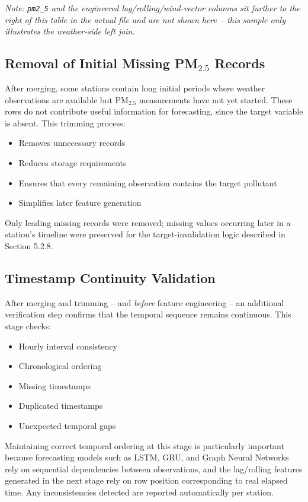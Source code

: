 \textit{Note: \texttt{pm2\_5} and the engineered lag/rolling/wind-vector columns sit
further to the right of this table in the actual file and are not shown here -- this
sample only illustrates the weather-side left join.}

\subsection{Removal of Initial Missing PM$_{2.5}$ Records}

After merging, some stations contain long initial periods where weather observations
are available but PM$_{2.5}$ measurements have not yet started. These rows do not
contribute useful information for forecasting, since the target variable is absent.
This trimming process:

\begin{itemize}
    \item Removes unnecessary records
    \item Reduces storage requirements
    \item Ensures that every remaining observation contains the target pollutant
    \item Simplifies later feature generation
\end{itemize}

Only leading missing records were removed; missing values occurring later in a
station's timeline were preserved for the target-invalidation logic described in
Section 5.2.8.

\subsection{Timestamp Continuity Validation}

After merging and trimming -- and \textit{before} feature engineering -- an additional
verification step confirms that the temporal sequence remains continuous. This stage
checks:

\begin{itemize}
    \item Hourly interval consistency
    \item Chronological ordering
    \item Missing timestamps
    \item Duplicated timestamps
    \item Unexpected temporal gaps
\end{itemize}

Maintaining correct temporal ordering at this stage is particularly important because
forecasting models such as LSTM, GRU, and Graph Neural Networks rely on sequential
dependencies between observations, and the lag/rolling features generated in the next
stage rely on row position corresponding to real elapsed time. Any inconsistencies
detected are reported automatically per station.

